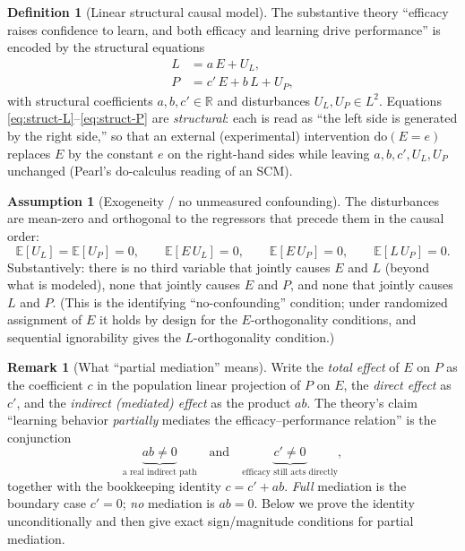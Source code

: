 \documentclass{amsart}
\theoremstyle{definition}
\newtheorem{definition}{Definition}
\newtheorem{assumption}{Assumption}
\newtheorem{remark}{Remark}
\begin{document}
\begin{definition}[Linear structural causal model]\label{def:scm}
The substantive theory ``efficacy raises confidence to learn, and both efficacy
and learning drive performance'' is encoded by the structural equations
\begin{align}
L &= a\,E + U_L, \label{eq:struct-L}\\
P &= c'\,E + b\,L + U_P, \label{eq:struct-P}
\end{align}
with structural coefficients $a,b,c'\in\mathbb R$ and disturbances
$U_L,U_P\in L^2$. Equations \eqref{eq:struct-L}--\eqref{eq:struct-P} are
\emph{structural}: each is read as ``the left side is generated by the right
side,'' so that an external (experimental) intervention $\mathrm{do}(E=e)$
replaces $E$ by the constant $e$ on the right-hand sides while leaving
$a,b,c',U_L,U_P$ unchanged (Pearl's $\mathrm{do}$-calculus reading of an SCM).
\end{definition}

\begin{assumption}[Exogeneity / no unmeasured confounding]\label{ass:exo}
The disturbances are mean-zero and orthogonal to the regressors that precede
them in the causal order:
\[
\mathbb E[U_L]=\mathbb E[U_P]=0,\qquad
\mathbb E[E\,U_L]=0,\qquad
\mathbb E[E\,U_P]=0,\qquad
\mathbb E[L\,U_P]=0 .
\]
Substantively: there is no third variable that jointly causes $E$ and $L$
(beyond what is modeled), none that jointly causes $E$ and $P$, and none that
jointly causes $L$ and $P$. (This is the identifying ``no-confounding''
condition; under randomized assignment of $E$ it holds by design for the
$E$-orthogonality conditions, and sequential ignorability gives the
$L$-orthogonality condition.)
\end{assumption}

\begin{remark}[What ``partial mediation'' means]
Write the \emph{total effect} of $E$ on $P$ as the coefficient $c$ in the
population linear projection of $P$ on $E$, the \emph{direct effect} as $c'$,
and the \emph{indirect (mediated) effect} as the product $ab$. The theory's
claim ``learning behavior \emph{partially} mediates the efficacy--performance
relation'' is the conjunction
\[
\underbrace{ab\neq 0}_{\text{a real indirect path}}
\quad\text{and}\quad
\underbrace{c'\neq 0}_{\text{efficacy still acts directly}} ,
\]
together with the bookkeeping identity $c=c'+ab$. \emph{Full} mediation is the
boundary case $c'=0$; \emph{no} mediation is $ab=0$. Below we prove the identity
unconditionally and then give exact sign/magnitude conditions for partial
mediation.
\end{remark}
\end{document}
